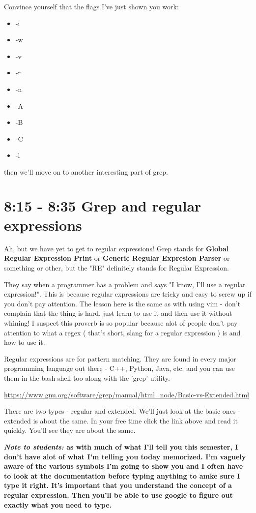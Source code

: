 \documentclass[10pt]{article}
\begin{document}
Convince yourself that the flags I've just shown you work:
\begin{itemize}
\item -i
\item -w
\item -v
\item -r
\item -n
\item -A
\item -B
\item -C
\item -l
\end{itemize}

then we'll move on to another interesting part of grep.

\section{8:15 - 8:35 Grep and regular expressions}

Ah, but we have yet to get to regular expressions! Grep stands for
\textbf{Global Regular Expression Print} or \textbf{Generic Regular Expresion
Parser} or something or other, but the "RE" definitely stands for Regular
Expression.

They say when a programmer has a problem and says "I know, I'll use a regular expression!". This is because regular expressions are tricky and easy to screw up if you don't pay attention. The lesson here is the same as with using vim - don't complain that the thing is hard, just learn to use it and then use it without whining! I suspect this proverb is so popular because alot of people don't pay attention to what a regex ( that's short, slang for a regular expression ) is and how to use it. 

Regular expressions are for pattern matching. They are found in every major programming language out there - C++, Python, Java, etc. and you can use them in the bash shell too along with the 'grep' utility.

\url{https://www.gnu.org/software/grep/manual/html_node/Basic-vs-Extended.html}

There are two types - regular and extended. We'll just look at the basic ones - extended is about the same. In your free time click the link above and read it quickly. You'll see they are about the same.

{\Large\textbf{\textit{Note to students:} as with much of what I'll tell you this
semester, I don't have alot of what I'm telling you today memorized. I'm vaguely
aware of the various symbols I'm going to show you and I often have to look at
the documentation before typing anything to amke sure I type it right. It's
important that you understand the concept of a regular expression. Then you'll
be able to use google to figure out exactly what you need to type.}}
\end{document}
